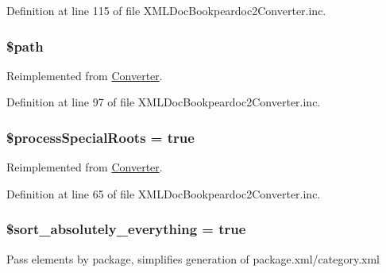 \-Definition at line 115 of file \-X\-M\-L\-Doc\-Bookpeardoc2\-Converter.\-inc.

\hypertarget{class_x_m_l_doc_bookpeardoc2_converter_a0a4baf0b22973c07685c3981f0d17fc4}{
\subsubsection[{\$path}]{\setlength{\rightskip}{0pt plus 5cm}\$path}}\label{class_x_m_l_doc_bookpeardoc2_converter_a0a4baf0b22973c07685c3981f0d17fc4}


\-Reimplemented from \hyperlink{class_converter_a0a4baf0b22973c07685c3981f0d17fc4}{\-Converter}.



\-Definition at line 97 of file \-X\-M\-L\-Doc\-Bookpeardoc2\-Converter.\-inc.

\hypertarget{class_x_m_l_doc_bookpeardoc2_converter_adcae2bdef17468fc5bf2f15981da497e}{
\subsubsection[{\$process\-Special\-Roots}]{\setlength{\rightskip}{0pt plus 5cm}\$process\-Special\-Roots = true}}\label{class_x_m_l_doc_bookpeardoc2_converter_adcae2bdef17468fc5bf2f15981da497e}


\-Reimplemented from \hyperlink{class_converter_adcae2bdef17468fc5bf2f15981da497e}{\-Converter}.



\-Definition at line 65 of file \-X\-M\-L\-Doc\-Bookpeardoc2\-Converter.\-inc.

\hypertarget{class_x_m_l_doc_bookpeardoc2_converter_a40eea215f3b8eaec5c134f45f62aa100}{
\subsubsection[{\$sort\-\_\-absolutely\-\_\-everything}]{\setlength{\rightskip}{0pt plus 5cm}\$sort\-\_\-absolutely\-\_\-everything = true}}\label{class_x_m_l_doc_bookpeardoc2_converter_a40eea215f3b8eaec5c134f45f62aa100}
\-Pass elements by package, simplifies generation of package.\-xml/category.xml 

